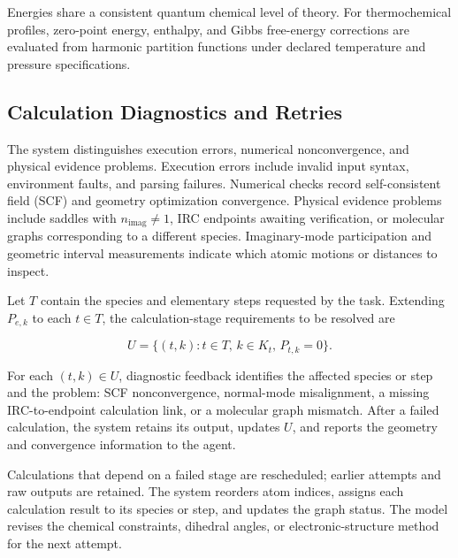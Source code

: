 Energies share a consistent quantum chemical level of theory. For thermochemical profiles, zero-point energy, enthalpy, and Gibbs free-energy corrections are evaluated from harmonic partition functions under declared temperature and pressure specifications.

\subsection{Calculation Diagnostics and Retries}
The system distinguishes execution errors, numerical nonconvergence, and physical evidence problems. Execution errors include invalid input syntax, environment faults, and parsing failures. Numerical checks record self-consistent field (SCF) and geometry optimization convergence. Physical evidence problems include saddles with $n_{\mathrm{imag}}\ne 1$, IRC endpoints awaiting verification, or molecular graphs corresponding to a different species. Imaginary-mode participation and geometric interval measurements indicate which atomic motions or distances to inspect.

Let $T$ contain the species and elementary steps requested by the task. Extending $P_{e,k}$ to each $t\in T$, the calculation-stage requirements to be resolved are

\begin{equation}\label{eq:methods-15}
U=\{(t,k):t\in T,\, k\in K_t,\, P_{t,k}=0\}.
\end{equation}

For each $(t,k)\in U$, diagnostic feedback identifies the affected species or step and the problem: SCF nonconvergence, normal-mode misalignment, a missing IRC-to-endpoint calculation link, or a molecular graph mismatch. After a failed calculation, the system retains its output, updates $U$, and reports the geometry and convergence information to the agent.

Calculations that depend on a failed stage are rescheduled; earlier attempts and raw outputs are retained. The system reorders atom indices, assigns each calculation result to its species or step, and updates the graph status. The model revises the chemical constraints, dihedral angles, or electronic-structure method for the next attempt.



